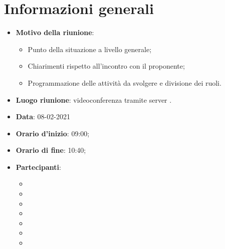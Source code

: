 \section{Informazioni generali}
\begin{itemize}
\item \textbf{Motivo della riunione}: 
\begin{itemize}
\item Punto della situazione a livello generale;
\item Chiarimenti rispetto all'incontro con il proponente;
\item Programmazione delle attività da svolgere e divisione dei ruoli.
\end{itemize}
\item \textbf{Luogo riunione}: videoconferenza tramite server .
\item \textbf{Data}: 08-02-2021
\item \textbf{Orario d'inizio}: 09:00;
\item \textbf{Orario di fine}: 10:40;
\item \textbf{Partecipanti}:
	\begin{itemize}
	\item \BM{}
	\item \SG{}
	\item \SP{}
	\item \SH{}
	\item \PA{}
	\item \ZM{}
	\item \RA{}
	\end{itemize}
\end{itemize}

\newpage
